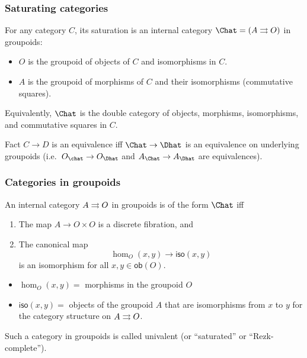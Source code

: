 \documentclass{beamer}
\begin{document}
\begin{frame}
  \frametitle{Saturating categories}
  For any category $C$, its \alert<1>{saturation} is an internal category $\Chat = (A\toto O)$ in groupoids:
  \begin{itemize}
  \item $O$ is the groupoid of objects of $C$ and isomorphisms in $C$.
  \item $A$ is the groupoid of morphisms of $C$ and their isomorphisms (commutative squares).
  \end{itemize}
  Equivalently, $\Chat$ is the double category of objects, morphisms, isomorphisms, and commutative squares in $C$.
  \pause
  \begin{block}{Fact}
    $C\to D$ is an equivalence iff $\Chat \to \Dhat$ is an \alert{equivalence on underlying groupoids} (i.e.\ $O_{\chat} \to O_{\Dhat}$ and $A_{\Chat} \to A_{\Dhat}$ are equivalences).
  \end{block}
\end{frame}

\begin{frame}
  \frametitle{Categories in groupoids}
  \begin{theorem}
    An internal category $A\rightrightarrows O$ in groupoids is of the form $\Chat$ iff
    \begin{enumerate}
    \item The map $A\to O\times O$ is a discrete fibration, and
    \item The canonical map
    \[ \hom_O(x,y) \to \mathsf{iso}(x,y) \]
    is an isomorphism for all $x,y\in \mathsf{ob}(O)$.
    \end{enumerate}
  \end{theorem}
  \begin{itemize}
  \item $\hom_O(x,y)=$ morphisms in the groupoid $O$
  \item $\mathsf{iso}(x,y)=$ objects of the groupoid $A$ that are isomorphisms from $x$ to $y$ for the category structure on $A\rightrightarrows O$.
  \end{itemize}
  Such a category in groupoids is called \alert{univalent} (or ``saturated'' or ``Rezk-complete'').
\end{frame}
\end{document}
